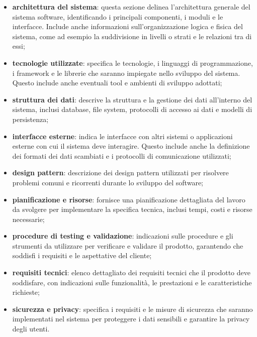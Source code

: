 \begin{itemize}
	\item \textbf{architettura del sistema}: questa sezione delinea l'architettura generale del sistema software, identificando i principali componenti, i moduli e le interfacce. Include anche informazioni sull'organizzazione logica e fisica del sistema, come ad esempio la suddivisione in livelli o strati e le relazioni tra di essi;
	\item \textbf{tecnologie utilizzate}: specifica le tecnologie, i linguaggi di programmazione, i framework e le librerie che saranno impiegate nello sviluppo del sistema. Questo include anche eventuali tool e ambienti di sviluppo adottati;
	\item \textbf{struttura dei dati}: descrive la struttura e la gestione dei dati all'interno del sistema, inclusi database, file system, protocolli di accesso ai dati e modelli di persistenza;
	\item \textbf{interfacce esterne}: indica le interfacce con altri sistemi o applicazioni esterne con cui il sistema deve interagire. Questo include anche la definizione dei formati dei dati scambiati e i protocolli di comunicazione utilizzati;
	\item \textbf{design pattern}: descrizione dei design pattern utilizzati per risolvere problemi comuni e ricorrenti durante lo sviluppo del software;
	\item \textbf{pianificazione e risorse}: fornisce una pianificazione dettagliata del lavoro da svolgere per implementare la specifica tecnica, inclusi tempi, costi e risorse necessarie;
	\item \textbf{procedure di testing e validazione}: indicazioni sulle procedure e gli strumenti da utilizzare per verificare e validare il prodotto, garantendo che soddisfi i requisiti e le aspettative del cliente;
	\item \textbf{requisiti tecnici}: elenco dettagliato dei requisiti tecnici che il prodotto deve soddisfare, con indicazioni sulle funzionalità, le prestazioni e le caratteristiche richieste;
	\item \textbf{sicurezza e privacy}: specifica i requisiti e le misure di sicurezza che saranno implementati nel sistema per proteggere i dati sensibili e garantire la privacy degli utenti.
\end{itemize}

